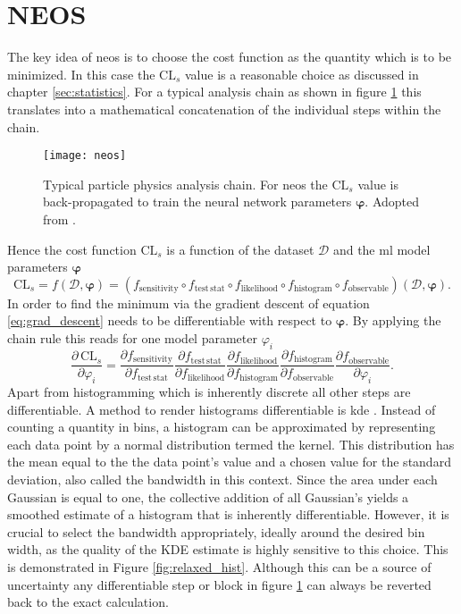 \section{NEOS}
The key idea of \acl{neos} is to choose the cost function as the quantity which is to be minimized. In this case the $\mathrm{CL}_s$ value is a reasonable choice as discussed in chapter \ref{sec:statistics}. For a typical analysis chain as shown in figure \ref{fig:neos} this translates into a mathematical concatenation of the individual steps within the chain.
\begin{figure}
    \centering
    \texttt{[image: neos]}
    \caption[]{Typical particle physics analysis chain. For \ac{neos} the $\text{CL}_s$ value is back-propagated to train the neural network parameters $\bm{\varphi}$. Adopted from \citep{Simpson_2023}.}
    \label{fig:neos}
\end{figure}
Hence the cost function $\text{CL}_s$ is a function of the dataset $\mathcal{D}$ and the \ac{ml} model parameters $\bm{\varphi}$
\begin{equation}
    \mathrm{CL}_s = f(\mathcal{D},\bm{\varphi}) = (f_{\mathrm{sensitivity}} \circ f_{\mathrm{test\,stat}} \circ f_{\mathrm{likelihood}}  \circ f_{\mathrm{histogram}}  \circ f_{\mathrm{observable}})(\mathcal{D},\bm{\varphi}).
\end{equation}
In order to find the minimum via the gradient descent of equation \ref{eq:grad_descent} \cls needs to be differentiable with respect to $\bm{\varphi}$. By applying the chain rule this reads for one model parameter $\varphi_i$
\begin{equation}
    \frac{\partial\,\mathrm{CL}_s}{\partial \varphi_i} = \frac{\partial f_{\mathrm{sensitivity}}}{\partial f_{\mathrm{test\,stat}}}\frac{\partial f_{\mathrm{test\,stat}}}{\partial f_{ \mathrm{likelihood}}} \frac{\partial f_{\mathrm{likelihood}}}{\partial f_{\mathrm{histogram}}}   \frac{\partial f_{\mathrm{histogram}}}{\partial f_{\mathrm{observable}}}  \frac{\partial f_{\mathrm{observable}}}{\partial \varphi_i}.
\end{equation}
Apart from histogramming which is inherently discrete all other steps are differentiable. A method to render histograms differentiable is \ac{kde} \citep{CRANMER2001198}. Instead of counting a quantity in bins, a histogram can be approximated by representing each data point by a normal distribution termed the kernel. This distribution has the mean equal to the the data point's value and a chosen value for the standard deviation, also called the bandwidth in this context. Since the area under each Gaussian is equal to one, the collective addition of all Gaussian's yields a smoothed estimate of a histogram that is inherently differentiable. However, it is crucial to select the bandwidth appropriately, ideally around the desired bin width, as the quality of the KDE estimate is highly sensitive to this choice. This is demonstrated in Figure \ref{fig:relaxed_hist}. Although this can be a source of uncertainty any differentiable step or block in figure \ref{fig:neos} can always be reverted back to the exact calculation.
